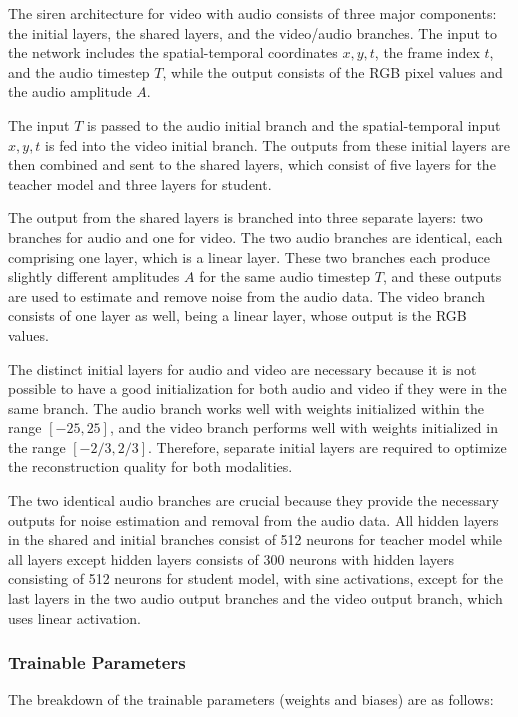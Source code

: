 \documentclass{ioereport}
\begin{document}
The \gls{siren} architecture for video with audio consists of three major components: the initial layers, the shared layers, and the video/audio branches. The input to the network includes the spatial-temporal coordinates \(x, y, t\), the frame index \(t\), and the audio timestep \(T\), while the output consists of the RGB pixel values and the audio amplitude \(A\).

The input \(T\) is passed to the audio initial branch and the  spatial-temporal input \(x, y, t\) is fed into the video initial branch. The outputs from these initial layers are then combined and sent to the shared layers, which consist of five layers for the teacher model and three layers for student.

The output from the shared layers is branched into three separate layers: two branches for audio and one for video. The two audio branches are identical, each comprising one layer, which  is a linear layer. These two branches each produce slightly different amplitudes \(A\) for the same audio timestep \(T\), and these outputs are used to estimate and remove noise from the audio data. The video branch consists of one layer as well, being a linear layer, whose output is the RGB values.

The distinct initial layers for audio and video are necessary because it is not possible to have a good initialization for both audio and video if they were in the same branch. The audio branch works well with weights initialized within the range \([-25, 25]\), and the video branch performs well with weights initialized in the range \([-2/3, 2/3]\). Therefore, separate initial layers are required to optimize the reconstruction quality for both modalities.

The two identical audio branches are crucial because they provide the necessary outputs for noise estimation and removal from the audio data. All hidden layers in the shared and initial branches consist of 512 neurons for teacher model while all layers except hidden layers consists of 300 neurons with hidden layers consisting of 512 neurons for student model, with sine activations, except for the last layers in the two audio output branches and the video output branch, which uses linear activation.

\subsubsection{Trainable Parameters}
The breakdown of the trainable parameters (weights and biases) are as follows:
\end{document}
